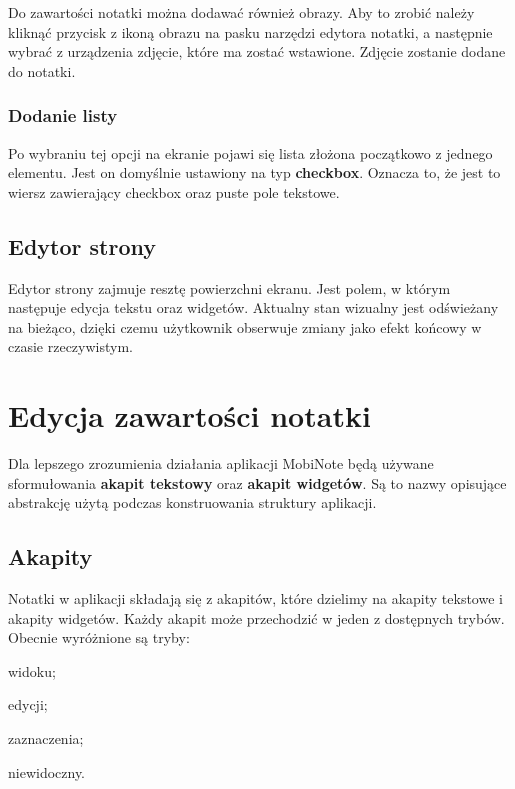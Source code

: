 Do zawartości notatki można dodawać również obrazy. Aby to zrobić należy kliknąć przycisk z ikoną obrazu na pasku narzędzi edytora notatki, a następnie wybrać z urządzenia zdjęcie, które ma zostać wstawione. Zdjęcie zostanie dodane do notatki.

\subsubsection{Dodanie listy}

Po wybraniu tej opcji na ekranie pojawi się lista złożona początkowo z jednego elementu.
Jest on domyślnie ustawiony na typ \textbf{checkbox}. Oznacza to, że jest to wiersz zawierający checkbox oraz puste pole tekstowe.

\subsection{Edytor strony}

Edytor strony zajmuje resztę powierzchni ekranu. Jest polem, w którym następuje edycja tekstu oraz widgetów. Aktualny stan wizualny jest odświeżany na bieżąco, dzięki czemu użytkownik obserwuje zmiany jako efekt końcowy w czasie rzeczywistym.



\section{Edycja zawartości notatki}

Dla lepszego zrozumienia działania aplikacji MobiNote będą używane sformułowania \textbf{akapit tekstowy} oraz \textbf{akapit widgetów}.
Są to nazwy opisujące abstrakcję użytą podczas konstruowania struktury aplikacji.

\subsection{Akapity}

Notatki w aplikacji składają się z akapitów, które dzielimy na akapity tekstowe i akapity widgetów.
Każdy akapit może przechodzić w jeden z dostępnych trybów.
Obecnie wyróżnione są tryby:

\begin{compactitem}
    \item widoku;
    \item edycji;
    \item zaznaczenia;
    \item niewidoczny.
\end{compactitem}

